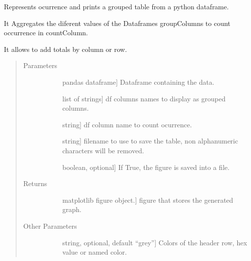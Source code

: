 \documentclass[letterpaper,10pt,english]{sphinxmanual}
\begin{document}
\begin{fulllineitems}
\label{\detokenize{rstFiles/ocurrTable:ocurrTable.ocurrenceTable}}
Represents ocurrence and prints a grouped table 
from a python dataframe.

It Aggregates the diferent values of 
the Dataframes groupColumns to count occurrence in countColumn.

It allows to add totals by column or row.
\begin{quote}\begin{description}
\item[{Parameters}] \leavevmode\begin{description}
\item[{}] \leavevmode{[}pandas dataframe{]}
Dataframe containing the data.

\item[{}] \leavevmode{[}list of strings{]}
df columns names to display as grouped columns.

\item[{}] \leavevmode{[}string{]}
df column name to count ocurrence.

\item[{}] \leavevmode{[}string{]}
filename to use to save the table, 
non alphanumeric characters will be removed.

\item[{}] \leavevmode{[}boolean, optional{]}
If True, the figure is saved into a file.

\end{description}

\item[{Returns}] \leavevmode\begin{description}
\item[{}] \leavevmode{[}matplotlib figure object.{]}
figure that stores the generated graph.

\end{description}

\item[{Other Parameters}] \leavevmode\begin{description}
\item[{}] \leavevmode{[}string, optional, default “grey”{]}
Colors of the header row, hex value or named color.


\end{description}
\end{description}
\end{quote}
\end{fulllineitems}
\end{document}
